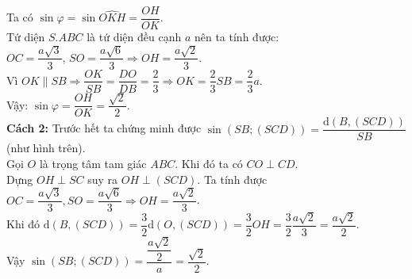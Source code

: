 \begin{ex}
{{\begin{tikzpicture}[line join=round,line cap=round, font=\footnotesize,scale=1,>=stealth]
            \end{tikzpicture}
        }
        \noindent Ta có $\sin\varphi=\sin\widehat{OKH}=\dfrac{OH}{OK}$.\\
        Tứ diện $S.ABC$ là tứ diện đều cạnh $a$ nên ta tính được:\\
        $OC=\dfrac{a\sqrt{3}}{3}$, $SO=\dfrac{a\sqrt{6}}{3}\Rightarrow OH=\dfrac{a\sqrt{2}}{3}$.\\
        Vì $OK\parallel SB\Rightarrow\dfrac{OK}{SB}=\dfrac{DO}{DB}=\dfrac{2}{3}\Rightarrow OK=\dfrac{2}{3}SB=\dfrac{2}{3}a$.\\
        Vậy: $\sin\varphi=\dfrac{OH}{OK}=\dfrac{\sqrt{2}}{2}$.\\
        \textbf{Cách 2:}
        Trước hết ta chứng minh được $\sin (SB;(SCD))=\dfrac{\mathrm{d}(B,(SCD))}{SB}$ (như hình trên).\\
        Gọi $O$ là trọng tâm tam giác $ABC$. Khi đó ta có $CO\perp CD$.\\
        Dựng $OH\perp SC$ suy ra $OH\perp (SCD)$. Ta tính được $OC=\dfrac{a\sqrt{3}}{3},SO=\dfrac{a\sqrt{6}}{3}\Rightarrow OH=\dfrac{a\sqrt{2}}{3}$.\\
        Khi đó $\mathrm{d}(B,(SCD))=\dfrac{3}{2}\mathrm{d}(O,(SCD))=\dfrac{3}{2}OH=\dfrac{3}{2}\dfrac{a\sqrt{2}}{3}=\dfrac{a\sqrt{2}}{2}$.\\
        Vậy $\sin (SB;(SCD))=\dfrac{\dfrac{a\sqrt{2}}{2}}{a}=\dfrac{\sqrt{2}}{2}$.
    }
\end{ex}

